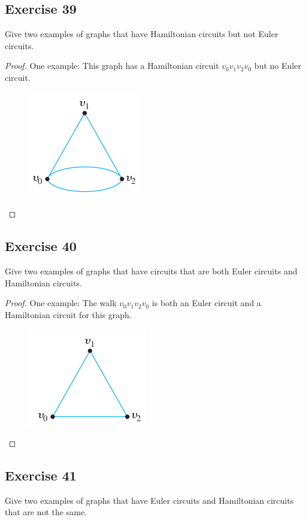 \documentclass[14pt]{extarticle}
\begin{document}
\subsection{Exercise 39}
Give two examples of graphs that have Hamiltonian circuits but not Euler circuits.

\begin{proof}
One example: This graph has a Hamiltonian circuit \(v_0v_1v_2v_0\) but no Euler circuit.

\begin{figure}[ht!]
\centering
\includegraphics[scale=0.5]{../images/10.1.39.png}
\end{figure}
\end{proof}

\subsection{Exercise 40}
Give two examples of graphs that have circuits that are both Euler circuits and Hamiltonian circuits.

\begin{proof}
One example: The walk \(v_0v_1v_2v_0\) is both an Euler circuit and a Hamiltonian circuit for this graph.

\begin{figure}[ht!]
\centering
\includegraphics[scale=0.5]{../images/10.1.40.png}
\end{figure}
\end{proof}

\subsection{Exercise 41}
Give two examples of graphs that have Euler circuits and Hamiltonian circuits that are not the same.
\end{document}
